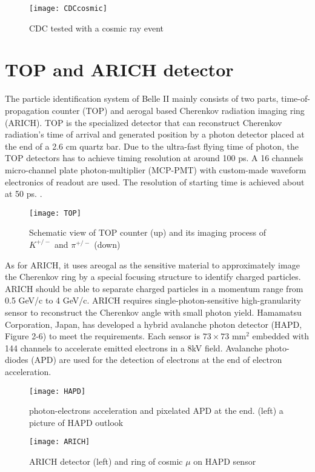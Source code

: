 \begin{figure}[H]
	\centering
	\texttt{[image: CDCcosmic]}
	\caption{CDC tested with a cosmic ray event}
\end{figure}


\section{TOP and ARICH detector}
The particle identification system of Belle II mainly consists of two parts, time-of-propagation counter (TOP) and aerogal based Cherenkov radiation imaging ring (ARICH). TOP is the specialized detector that can reconstruct Cherenkov radiation's time of arrival and generated position by a photon detector placed at the end of a 2.6 cm quartz bar. Due to the ultra-fast flying time of photon, the TOP detectors has to achieve timing resolution at around 100 ps. A 16 channels micro-channel plate photon-multiplier (MCP-PMT) with custom-made waveform electronics of readout are used. The resolution of starting time is achieved about at 50 ps. \cite{Abe:2010gxa}. 

\begin{figure}[H]
	\centering
	\texttt{[image: TOP]}
	\caption{Schematic view of TOP counter (up) and its imaging process of $K^{+/-}$ and $\pi^{+/-}$ (down)}
\end{figure}

As for ARICH, it uses areogal as the sensitive material to approximately image the Cherenkov ring by a special focusing structure to identify charged particles. ARICH should be able to separate charged particles in a momentum range from 0.5 GeV/c to 4 GeV/c. ARICH requires single-photon-sensitive  high-granularity sensor to reconstruct the Cherenkov angle with small photon yield. Hamamatsu Corporation, Japan, has developed a hybrid avalanche photon detector (HAPD, Figure 2-6) to meet the requirements. Each sensor is $73 \times 73$ mm$^2$ embedded with 144 channels to accelerate emitted electrons in a 8kV field. Avalanche photo-diodes (APD) are used for the detection of electrons at the end of electron acceleration. 

\begin{figure}[H]
	\centering
	\texttt{[image: HAPD]}
	\caption{photon-electrons acceleration and pixelated APD at the end. (left)
		a picture of HAPD outlook \cite{Abe:2010gxa}}
\end{figure}



\begin{figure}[H]
	\centering
	\texttt{[image: ARICH]}
	\caption{ARICH detector (left) and ring of cosmic $\mu$ on HAPD sensor\cite{b2book}}
\end{figure}

